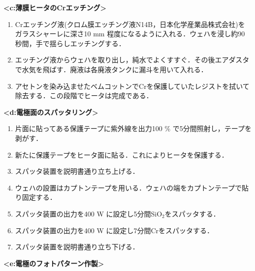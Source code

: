 \clearpage




\textbf{<c:薄膜ヒータのCrエッチング>}

\begin{enumerate}
\item Crエッチング液(クロム膜エッチング液N14B，日本化学産業品株式会社)をガラスシャーレに深さ10 mm 程度になるように入れる．ウェハを浸し約90秒間，手で揺らしエッチングする．

\item エッチング液からウェハを取り出し，純水でよくすすぐ．その後エアダスタで水気を飛ばす．廃液は各廃液タンクに漏斗を用いて入れる．
\item アセトンを染み込ませたベムコットンでCrを保護していたレジストを拭いて除去する．この段階でヒータは完成である．


\end{enumerate} 
\vspace{5zh}

\textbf{<d:電極面のスパッタリング>}

\begin{enumerate}

\item 片面に貼ってある保護テープに紫外線を出力100 \% で5分間照射し，テープを剥がす．
\item 新たに保護テープをヒータ面に貼る．これによりヒータを保護する．
\item スパッタ装置を説明書通り立ち上げる． 
\item ウェハの設置はカプトンテープを用いる．ウェハの端をカプトンテープで貼り固定する．
\item スパッタ装置の出力を400 W に設定し5分間SiO$_{2}$をスパッタする．
\item スパッタ装置の出力を400 W に設定し7分間Crをスパッタする．
\item スパッタ装置を説明書通り立ち下げる．


\clearpage
\end{enumerate} 

\newpage
\textbf{<e:電極のフォトパターン作製>}

